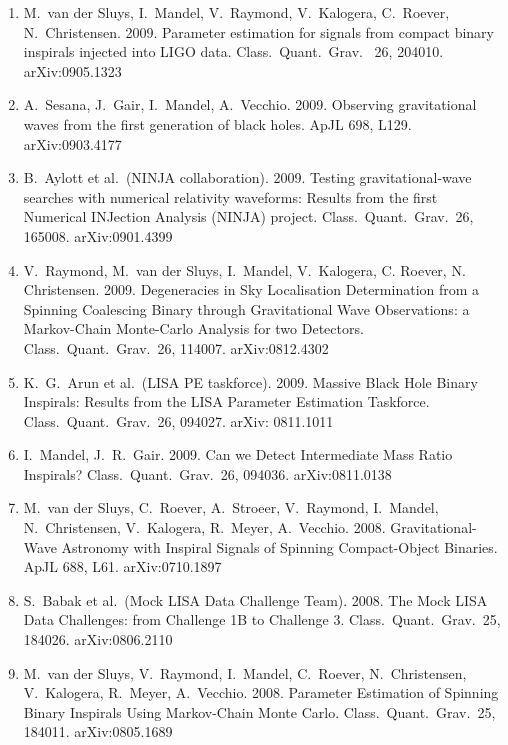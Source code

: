\documentclass[margin,line]{res}
\begin{document}
\begin{resume}
\begin{enumerate}
\item  M.~van der Sluys, I.~Mandel, V.~Raymond, V.~Kalogera, C.~Roever, N.~Christensen. 2009. Parameter estimation for signals from compact binary inspirals injected into LIGO data.  Class.~Quant.~Grav.~ 26, 204010. arXiv:0905.1323

\item  A.~Sesana, J.~Gair, I.~Mandel, A.~Vecchio. 2009. Observing gravitational waves from the first generation of black holes.  ApJL 698, L129. arXiv:0903.4177 

\item  B.~Aylott et al.~(NINJA collaboration).  2009. Testing gravitational-wave searches with numerical relativity waveforms: Results from the first Numerical INJection Analysis (NINJA) project.  Class.~Quant.~Grav.~26, 165008.  arXiv:0901.4399

\item  V.~Raymond, M.~van der Sluys, I.~Mandel, V.~Kalogera, C. Roever, N. Christensen.  2009. Degeneracies in Sky Localisation Determination from a Spinning Coalescing Binary through Gravitational Wave Observations: a Markov-Chain Monte-Carlo Analysis for two Detectors. Class.~Quant.~Grav.~26, 114007.  arXiv:0812.4302

\item  K.~G.~Arun et al.~(LISA PE taskforce). 2009.  Massive Black Hole Binary Inspirals: Results from the LISA Parameter Estimation Taskforce.  Class.~Quant.~Grav.~26, 094027.  arXiv: 0811.1011

\item  I.~Mandel, J.~R.~Gair.  2009.  Can we Detect Intermediate Mass Ratio Inspirals?  Class.~Quant.~Grav.~26, 094036.  arXiv:0811.0138

\item  M.~van der Sluys, C.~Roever, A.~Stroeer, V.~Raymond, I.~Mandel, N.~Christensen, 
V.~Kalogera, R.~Meyer, A.~Vecchio. 2008.  Gravitational-Wave Astronomy with Inspiral Signals of Spinning Compact-Object Binaries.  ApJL 688, L61. arXiv:0710.1897

\item  S.~Babak et al.~(Mock LISA Data Challenge Team). 2008. The Mock LISA Data Challenges: from Challenge 1B to Challenge 3.  Class.~Quant.~Grav.~25, 184026.
arXiv:0806.2110 

\item  M.~van der Sluys, V.~Raymond, I.~Mandel, C.~Roever, N.~Christensen, 
V.~Kalogera, R.~Meyer, A.~Vecchio.  2008. Parameter Estimation of 
Spinning Binary Inspirals Using Markov-Chain Monte Carlo.  Class.~Quant.~Grav.~25, 184011.
arXiv:0805.1689


\end{enumerate}
\end{resume}
\end{document}

